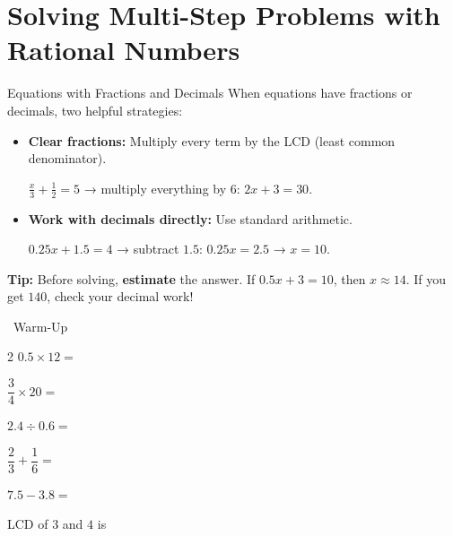 \section{Solving Multi-Step Problems with Rational Numbers}

\begin{quickReview}{Equations with Fractions and Decimals}
When equations have fractions or decimals, two helpful strategies:
\begin{itemize}[leftmargin=*]
    \item \textbf{Clear fractions:} Multiply every term by the LCD (least common denominator).
    
    $\frac{x}{3} + \frac{1}{2} = 5$ → multiply everything by $6$: $2x + 3 = 30$.
    \item \textbf{Work with decimals directly:} Use standard arithmetic.
    
    $0.25x + 1.5 = 4$ → subtract $1.5$: $0.25x = 2.5$ → $x = 10$.
\end{itemize}

\medskip
\textbf{Tip:} Before solving, \textbf{estimate} the answer. If $0.5x + 3 = 10$, then $x \approx 14$. If you get $140$, check your decimal work!
\end{quickReview}

\begin{practiceBox}[funGreen]{\faSun~Warm-Up}


\begin{multicols}{2}
\prob $0.5 \times 12 = $ \answerBlank[2cm]

\prob $\dfrac{3}{4} \times 20 = $ \answerBlank[2cm]

\prob $2.4 \div 0.6 = $ \answerBlank[2cm]

\prob $\dfrac{2}{3} + \dfrac{1}{6} = $ \answerBlank[2cm]

\prob $7.5 - 3.8 = $ \answerBlank[2cm]

\prob LCD of $3$ and $4$ is \answerBlank[2cm]
\end{multicols}
\end{practiceBox}

